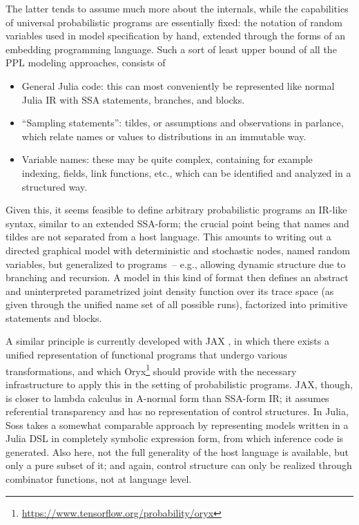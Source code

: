 The latter tends to assume much more about the internals, while the capabilities of universal
probabilistic programs are essentially fixed: the notation of random variables used in model
specification by hand, extended through the forms of an embedding programming language.  Such a sort
of least upper bound of all the PPL modeling approaches, consists of
\begin{itemize}
  \firmlist
\item General Julia code: this can most conveniently be represented like normal Julia IR with SSA
  statements, branches, and blocks.
\item \enquote{Sampling statements}: tildes, or assumptions and observations in \turingjl{}
  parlance, which relate names or values to distributions in an immutable way.
\item Variable names: these may be quite complex, containing for example indexing, fields, link
  functions, etc., which can be identified and analyzed in a structured way.
\end{itemize}
Given this, it seems feasible to define arbitrary probabilistic programs an IR-like syntax, similar
to an extended SSA-form; the crucial point being that names and tildes are not separated from a host
language.  This amounts to writing out a directed graphical model with deterministic and stochastic
nodes, named random variables, but generalized to programs~-- e.g., allowing dynamic structure due
to branching and recursion.  A model in this kind of format then defines an abstract and
uninterpreted parametrized joint density function over its trace space (as given through the unified
name set of all possible runs), factorized into primitive statements and blocks.

A similar principle is currently developed with JAX \parencite{bradbury2018jax}, in which there
exists a unified representation of functional programs that undergo various transformations, and
which Oryx\footnote{\protect\url{https://www.tensorflow.org/probability/oryx}} should provide with
the necessary infrastructure to apply this in the setting of probabilistic programs.  JAX, though,
is closer to lambda calculus in A-normal form than SSA-form IR; it assumes referential transparency
and has no representation of control structures.  In Julia, Soss \parencite{scherrer2019soss} takes
a somewhat comparable approach by representing models written in a Julia DSL in completely symbolic
expression form, from which inference code is generated.  Also here, not the full generality of the
host language is available, but only a pure subset of it; and again, control structure can only be
realized through combinator functions, not at language level.

